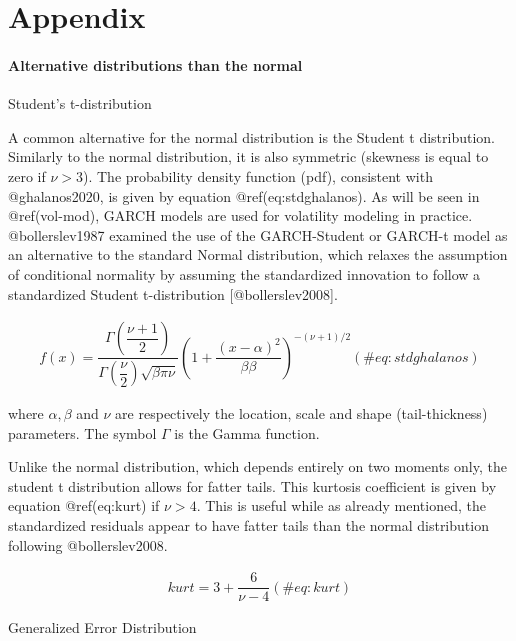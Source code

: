 \documentclass[
]{article}
\author{}
\date{\vspace{-2.5em}}
\begin{document}
\startappendices

\hypertarget{appendix}{%
\section{Appendix}\label{appendix}}

\hypertarget{conditional-distributions}{%
\paragraph{Alternative distributions than the
normal}\label{conditional-distributions}}

Student's t-distribution

\noindent A common alternative for the normal distribution is the
Student t distribution. Similarly to the normal distribution, it is also
symmetric (skewness is equal to zero if \(\nu > 3\)). The probability
density function (pdf), consistent with @ghalanos2020, is given by
equation @ref(eq:stdghalanos). As will be seen in @ref(vol-mod), GARCH
models are used for volatility modeling in practice. @bollerslev1987
examined the use of the GARCH-Student or GARCH-t model as an alternative
to the standard Normal distribution, which relaxes the assumption of
conditional normality by assuming the standardized innovation to follow
a standardized Student t-distribution {[}@bollerslev2008{]}.

\begin{align}
f(x) = \dfrac{\Gamma(\dfrac{\nu+1}{2})}{\Gamma(\dfrac{\nu}{2})\sqrt{\beta \pi \nu}} \left(1+\dfrac{(x-\alpha)^2}{\beta \beta}\right)^{-(\nu+1)/2}
 (\#eq:stdghalanos)
\end{align}

\noindent where \(\alpha, \beta\) and \(\nu\) are respectively the
location, scale and shape (tail-thickness) parameters. The symbol
\(\Gamma\) is the Gamma function.

\noindent Unlike the normal distribution, which depends entirely on two
moments only, the student t distribution allows for fatter tails. This
kurtosis coefficient is given by equation @ref(eq:kurt) if \(\nu>4\).
This is useful while as already mentioned, the standardized residuals
appear to have fatter tails than the normal distribution following
@bollerslev2008.

\begin{align}
kurt = 3 + \dfrac{6}{\nu-4}
 (\#eq:kurt)
\end{align}

Generalized Error Distribution
\end{document}
